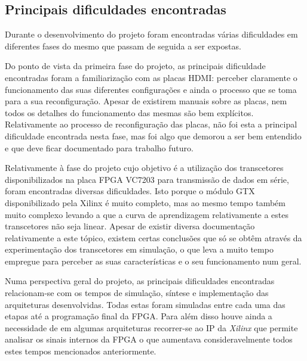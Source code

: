 \subsection*{Principais dificuldades encontradas}

Durante o desenvolvimento do projeto foram encontradas várias dificuldades em diferentes fases do mesmo que passam de seguida a ser expostas.

Do ponto de vista da primeira fase do projeto, as principais dificuldade encontradas foram a familiarização com as placas HDMI: perceber claramente o funcionamento das suas diferentes configurações e ainda o processo que se toma para a sua reconfiguração. Apesar de existirem manuais sobre as placas, nem todos os detalhes do funcionamento das mesmas são bem explícitos. Relativamente ao processo de reconfiguração das placas, não foi esta a principal dificuldade encontrada nesta fase, mas foi algo que demorou a ser bem entendido e que deve ficar documentado para trabalho futuro. 


Relativamente à fase do projeto cujo objetivo é a utilização dos transcetores disponibilizados na placa FPGA VC7203 para transmissão de dados em série, foram encontradas diversas dificuldades. Isto porque o módulo GTX disponibilizado pela Xilinx é muito completo, mas ao mesmo tempo também muito complexo levando a que a curva de aprendizagem relativamente a estes transcetores não seja linear. Apesar de existir diversa documentação relativamente a este tópico, existem certas conclusões que só se obtêm através da experimentação dos transcetores em simulação, o que leva a muito tempo empregue para perceber as suas características e o seu funcionamento num geral.



Numa perspectiva geral do projeto, as principais dificuldades encontradas relacionam-se com os tempos de simulação, síntese e implementação das arquiteturas desenvolvidas. Todas estas foram simuladas entre cada uma das etapas até a programação final da FPGA. Para além disso houve ainda a necessidade de em algumas arquiteturas recorrer-se ao IP da \textit{Xilinx} que permite analisar os sinais internos da FPGA o que aumentava consideravelmente todos estes tempos mencionados anteriormente.



